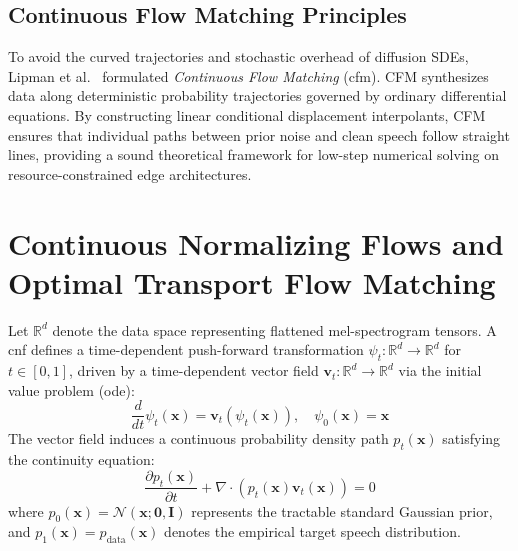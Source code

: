 \subsection{Continuous Flow Matching Principles}
To avoid the curved trajectories and stochastic overhead of diffusion SDEs, Lipman et al.~\cite{lipman2022flow} formulated \textit{Continuous Flow Matching} (\acrshort{cfm}). CFM synthesizes data along deterministic probability trajectories governed by ordinary differential equations. By constructing linear conditional displacement interpolants, CFM ensures that individual paths between prior noise and clean speech follow straight lines, providing a sound theoretical framework for low-step numerical solving on resource-constrained edge architectures.

\section{Continuous Normalizing Flows and Optimal Transport Flow Matching}
\label{sec:cfm_theory}
Let $\mathbb{R}^d$ denote the data space representing flattened mel-spectrogram tensors. A \gls{cnf} defines a time-dependent push-forward transformation $\psi_t: \mathbb{R}^d \to \mathbb{R}^d$ for $t \in [0, 1]$, driven by a time-dependent vector field $\mathbf{v}_t: \mathbb{R}^d \to \mathbb{R}^d$ via the initial value problem (\acrshort{ode}):
\begin{equation}
    \frac{d}{dt} \psi_t(\mathbf{x}) = \mathbf{v}_t(\psi_t(\mathbf{x})), \quad \psi_0(\mathbf{x}) = \mathbf{x}
    \label{eq:flow_ivp}
\end{equation}
The vector field induces a continuous probability density path $p_t(\mathbf{x})$ satisfying the continuity equation:
\begin{equation}
    \frac{\partial p_t(\mathbf{x})}{\partial t} + \nabla \cdot (p_t(\mathbf{x}) \mathbf{v}_t(\mathbf{x})) = 0
    \label{eq:continuity_equation}
\end{equation}
where $p_0(\mathbf{x}) = \mathcal{N}(\mathbf{x}; \mathbf{0}, \mathbf{I})$ represents the tractable standard Gaussian prior, and $p_1(\mathbf{x}) = p_{\text{data}}(\mathbf{x})$ denotes the empirical target speech distribution.

